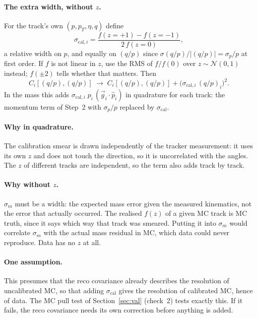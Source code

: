 \documentclass[11pt,a4paper]{article}
\newcommand{\qp}{(q/p)}
\newcommand{\vb}[1]{\vec{#1}}
\newcommand{\scal}{\sigma_{\mathrm{cal}}}
\begin{document}
\paragraph{The extra width, without $z$.} For the track's own $(p, p_T, \eta, q)$ define
\begin{equation}
  \sigma_{\mathrm{cal},i} = \frac{f(z=+1) - f(z=-1)}{2\, f(z=0)},
  \label{eq:scal}
\end{equation}
a relative width on $p$, and equally on $\qp$ since $\sigma\qp/|\qp| = \sigma_p/p$ at first order. If $f$
is not linear in $z$, use the RMS of $f/f(0)$ over $z\sim\mathcal N(0,1)$ instead; $f(\pm2)$ tells whether
that matters. Then
\begin{equation}
  C_i[\qp,\qp] \;\longrightarrow\; C_i[\qp,\qp] + \big(\sigma_{\mathrm{cal},i}\,\qp_i\big)^2 .
\end{equation}
In the mass this adds $\sigma_{\mathrm{cal},i}\; p_i\,(\vb g_i\cdot\hat p_i)$ in quadrature for each track: the momentum
term of Step~2 with $\sigma_p/p$ replaced by $\scal$.

\paragraph{Why in quadrature.} The calibration smear is drawn independently of the tracker measurement: it
uses its own $z$ and does not touch the direction, so it is uncorrelated with the angles. The $z$ of
different tracks are independent, so the term also adds track by track.

\paragraph{Why without $z$.} $\sigma_m$ must be a width: the expected mass error given the measured
kinematics, not the error that actually occurred. The realised $f(z)$ of a given MC track is MC truth, since
it says which way that track was smeared. Putting it into $\sigma_m$ would correlate $\sigma_m$ with the
actual mass residual in MC, which data could never reproduce. Data has no $z$ at all.

\paragraph{One assumption.} This presumes that the reco covariance already describes the resolution of
uncalibrated MC, so that adding $\scal$ gives the resolution of calibrated MC, hence of data. The MC pull
test of Section~\ref{sec:val} (check~2) tests exactly this. If it fails, the reco covariance needs its own
correction before anything is added.
\end{document}
